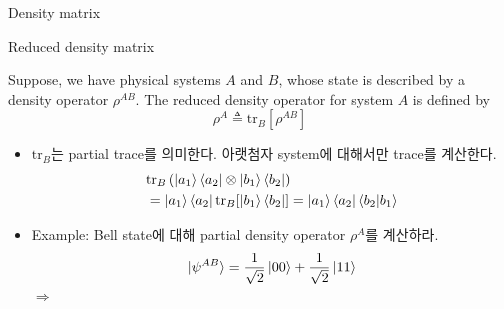 \documentclass[9pt]{beamer}
\begin{document}
\begin{section}{Density matrix}
        \begin{frame}{Reduced density matrix}
            \begin{definition}
                Suppose, we have physical systems $A$ and $B$, whose state is described by a density operator $\rho^{AB}$. The reduced density operator for system $A$ is defined by 
                $$\rho^A \triangleq \text{tr}_B[\rho^{AB}]$$
            \end{definition}
            \begin{itemize}
                \item $\text{tr}_B$는 partial trace를 의미한다. 아랫첨자 system에 대해서만 trace를 계산한다.
                \begin{align*}
                    & \text{tr}_B\left(\left|a_1\right\rangle\left\langle a_2|\otimes| b_1\right\rangle \langle b_2 |\right) \\
                    &= \left|a_1\right\rangle\left\langle a_2| \operatorname{tr}_B[| b_1\right\rangle \langle b_2 |] = \left|a_1\right\rangle \langle a_2|\braket{b_2|b_1}
                \end{align*}
                \item Example: Bell state에 대해 partial density operator $\rho^A$를 계산하라.
                $$\ket{\psi^{AB}} = {\frac{1}{\sqrt 2}} \ket{00} + \frac{1}{\sqrt 2} \ket{11}$$
                $\Rightarrow$
                \vspace{2.5cm}
            \end{itemize}
        \end{frame}
    \end{section}
\end{document}
